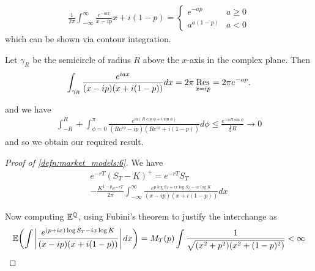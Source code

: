 \begin{lem}
  \begin{align}
    \label{eq:118}
    \frac{1}{2\pi} \int_{-\infty}^{\infty} \frac{e^{-iax}}{x-ip}{x +
      i(1-p)} =
    \begin{cases}
      e^{-ap} & a \geq 0 \\
      a^{a(1-p)} & a < 0
    \end{cases}
  \end{align}
  which can be shown via contour integration.

  Let $\gamma_{R}$ be the semicircle of radius $R$ above the $x$-axis
  in the complex plane. Then
  \begin{align}
    \label{eq:119}
    \int_{\gamma_{R}} \frac{e^{iax}}{(x-ip)(x+i(1-p))} dx = 2\pi
    \operatorname*{Res}_{x=ip} = 2\pi e^{-ap}.
  \end{align}

  and we have
  \begin{align}
    \label{eq:120}
    \int_{-R}^{R} + \int_{\phi=0}^{\pi} \frac{e^{ia(R \cos \phi + i
        \sin \phi)}}{(Re^{i \phi} - ip)(Re^{i \phi} + i(1-p))} d\phi
    \leq \frac{e^{-aR\sin \phi}}{\frac{1}{2}R} \rightarrow 0
  \end{align} and so we obtain our required result.
\end{lem}

\begin{proof}[Proof of \ref{defn:market_models:6}]
  We have
  \begin{multline}
    \label{eq:121}
    e^{-rT}(S_{T} - K)^{+} = e^{-rT} S_{T} \\ - \frac{K^{1-p}
      e^{-rT}}{2\pi} \int_{-\infty}^{\infty} \frac{e^{p\log S_{T} +
        ix\log S_{T} - ix \log K}}{(x - ip)(x + i(1-p))} dx 
  \end{multline}

  Now computing $\mathbb{E}^{\Q}$, using Fubini's theorem to justify
  the interchange as
  \begin{align}
    \label{eq:122}
    \E{\int \left| \frac{e^{(p + ix) \log S_{T} - ix \log K}}{(x - ip)(x +
        i(1-p))}\right| dx}  = M_{T}(p) \int \frac{1}{\sqrt{(x^{2} +
        p^{2})(x^{2} + (1 - p)^{2})}} < \infty
  \end{align}
\end{proof}

